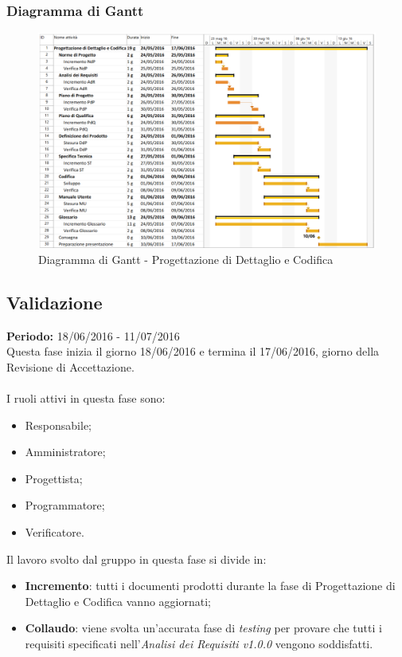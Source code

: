 \subsubsection{Diagramma di Gantt}
\begin{figure}[H]
	\centering
	\includegraphics[width= 16cm]{immagini/pdc_gantt.png}
	\caption{Diagramma di Gantt - Progettazione di Dettaglio e Codifica}
\end{figure}
\newpage

\subsection{Validazione}
\textbf{Periodo:} 18/06/2016 - 11/07/2016\\
Questa fase inizia il giorno 18/06/2016 e termina il 17/06/2016, giorno della 
Revisione di Accettazione. \\\\
I ruoli attivi in questa fase sono:

\begin{itemize}
	\item Responsabile;
	\item Amministratore;
	\item Progettista;
	\item Programmatore;
	\item Verificatore.
\end{itemize}
Il lavoro svolto dal gruppo in questa fase si divide in:
\begin{itemize}
	\item \textbf{Incremento}: tutti i documenti prodotti durante la fase di 
	Progettazione di Dettaglio e Codifica vanno aggiornati;
	\item \textbf{Collaudo}: viene svolta un'accurata fase di \textit{testing} 
	per provare che tutti i requisiti specificati nell'\textit{Analisi dei 
	Requisiti v1.0.0} vengono soddisfatti.
\end{itemize}


